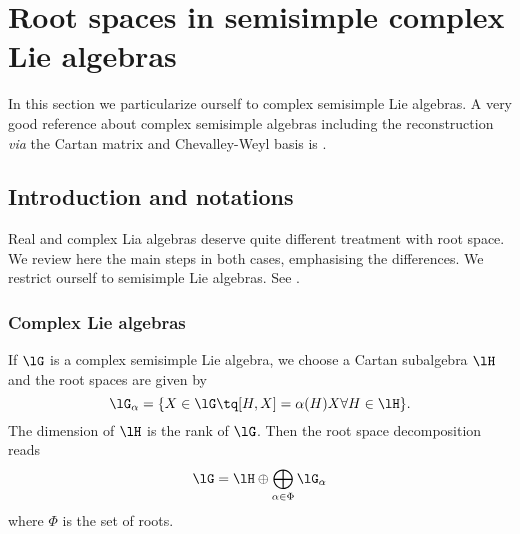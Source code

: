 \section{Root spaces in semisimple complex Lie algebras}
\label{SecRootcomplexss}
In this section we particularize ourself to complex semisimple Lie algebras. A very good reference about complex semisimple algebras including the reconstruction \emph{via} the Cartan matrix and Chevalley-Weyl basis is \cite{SerreSSAlgebres}.

\subsection{Introduction and notations}

Real and complex Lia algebras deserve quite different treatment with root space. We review here the main steps in both cases, emphasising the differences. We restrict ourself to semisimple Lie algebras. See \cite{Wisser}.

\subsubsection{Complex Lie algebras}

If \( \lG\) is a complex semisimple Lie algebra, we choose a Cartan subalgebra \( \lH\) and the root spaces are given by
\begin{equation}
	\lG_{\alpha}=\{ X\in\lG\tq [H,X]=\alpha(H)X \forall H\in\lH \}.
\end{equation}
The dimension of \( \lH\) is the rank of \( \lG\). Then the root space decomposition reads
\begin{equation}
	\lG=\lH\oplus\bigoplus_{\alpha\in\Phi}\lG_{\alpha}
\end{equation}
where \( \Phi\) is the set of roots.

